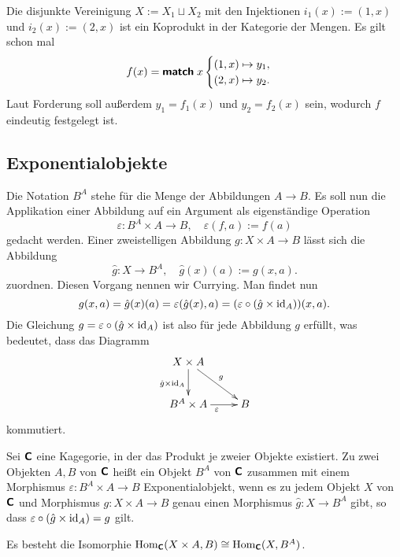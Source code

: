 \noindent
Die disjunkte Vereinigung $X:=X_1\sqcup X_2$ mit den Injektionen
$i_1(x):=(1,x)$ und $i_2(x):=(2,x)$ ist ein Koprodukt in der
Kategorie der Mengen. Es gilt schon mal
\[f(x) = \textsf{\textbf{match}}\; x \begin{cases}
(1,x)\mapsto y_1,\\
(2,x)\mapsto y_2.
\end{cases}\]
Laut Forderung soll außerdem $y_1 = f_1(x)$ und $y_2 = f_2(x)$ sein,
wodurch $f$ eindeutig festgelegt ist.

\subsection{Exponentialobjekte}

Die Notation $B^A$ stehe für die Menge der Abbildungen $A\to B$.
Es soll nun die Applikation einer Abbildung auf ein Argument
als eigenständige Operation
\[\varepsilon\colon B^A\times A \to B,\quad
\varepsilon(f,a) := f(a)\]
gedacht werden. Einer zweistelligen Abbildung
$g\colon X\times A\to B$ lässt sich die Abbildung
\[\hat g\colon X\to B^A,\quad \hat g(x)(a) := g(x,a).\]
zuordnen. Diesen Vorgang nennen wir Currying. Man findet nun
\[g(x,a) = \hat g(x)(a) = \varepsilon(\hat g(x),a)
= (\varepsilon\circ (\hat g\times\operatorname{id}_A))(x,a).\]
Die Gleichung $g = \varepsilon\circ(\hat g\times\operatorname{id}_A)$ ist also
für jede Abbildung $g$ erfüllt, was bedeutet, dass das Diagramm
\[\xymatrix{
X\times A\ar[dr]^g\ar[d]_{\hat g\times\id_A} & \\
B^A\times A \ar[r]_{\varepsilon} & B
}\]
kommutiert.

\begin{Definition}[Exponentialobjekt]%
\label{def:Exponentialobjekt}\newlinefirst
Sei $\textsf{\textbf{C}}$ eine Kagegorie, in der das Produkt je zweier Objekte
existiert. Zu zwei Objekten $A,B$ von $\textsf{\textbf{C}}$ heißt ein
Objekt $B^A$ von $\textsf{\textbf{C}}$ zusammen mit einem Morphismus
$\varepsilon\colon B^A\times A\to B$ Exponentialobjekt, wenn es zu jedem
Objekt $X$ von $\textsf{\textbf{C}}$ und Morphismus $g\colon X\times A\to B$
genau einen Morphismus $\hat g\colon X\to B^A$ gibt, so dass
$\varepsilon\circ (\hat g\times\operatorname{id}_A) = g$ gilt.
\end{Definition}

\begin{Satz}\label{Exp-Isomorphie}
Es besteht die Isomorphie
$\operatorname{Hom}_{\textsf{\textbf{C}}}(X\times A, B)\cong\operatorname{Hom}_{\textsf{\textbf{C}}}(X,B^A)$.
\end{Satz}

